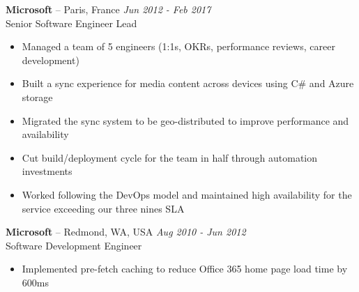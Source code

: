 \documentclass[]{rob-keim-resume}
\begin{document}
{\bf Microsoft} --  Paris, France \hfill {\sl Jun 2012 - Feb 2017} \\
Senior Software Engineer Lead
\begin{itemize} \itemsep -2pt
	\item Managed a team of 5 engineers (1:1s, OKRs, performance reviews, career development)	
	\item Built a sync experience for media content across devices using C\# and Azure storage
	\item Migrated the sync system to be geo-distributed to improve performance and availability
	\item Cut build/deployment cycle for the team in half through automation investments
	\item Worked following the DevOps model and maintained high availability for the service exceeding our three nines SLA
\end{itemize}

{\bf Microsoft} --  Redmond, WA, USA \hfill {\sl Aug 2010 - Jun 2012} \\
Software Development Engineer
\begin{itemize} \itemsep -2pt
	\item Implemented pre-fetch caching to reduce Office 365 home page load time by 600ms
\end{itemize}


\end{document}
